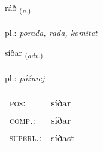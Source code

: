 \documentclass[frontgrid, backgrid]{flacards}\usepackage[]{graphicx}\usepackage[]{xcolor}
\begin{document}
\renewcommand{\flhead}{\vskip5pt \fboxsep=0pt {\small\bfseries\footnotesize Nafnorð | rzeczownik}}
\renewcommand{\fcfoot}{\vskip5pt \fboxsep=0pt \hspace{2pt}{\small\bfseries\footnotesize 1K}}

\renewcommand{\blhead}{\vskip5pt {\small\bfseries\footnotesize Nafnorð | rzeczownik }}
\renewcommand{\bcfoot}{\vskip5pt \hspace{2pt}{\small\bfseries\footnotesize 1K}}


{ráð \small{\textsubscript{(\textit{n.})}} \\[1ex] %
\textphonetic{[rauːð]} \\
pl.: \emph{porada, rada, komitet} \\  [2ex]
\renewcommand*{\arraystretch}{0.8}
}

\renewcommand{\flhead}{\vskip5pt \fboxsep=0pt {\small\bfseries\footnotesize Atviksorð | przysłówek}}
\renewcommand{\fcfoot}{\vskip5pt \fboxsep=0pt \hspace{2pt}{\small\bfseries\footnotesize 1K}}

\renewcommand{\blhead}{\vskip5pt {\small\bfseries\footnotesize Atviksorð | przysłówek }}
\renewcommand{\bcfoot}{\vskip5pt \hspace{2pt}{\small\bfseries\footnotesize 1K}}


{síðar \small{\textsubscript{(\textit{adv.})}} \\[1ex] %
\textphonetic{[siːðar]} \\
pl.: \emph{później} \\  [2ex]
\renewcommand*{\arraystretch}{0.8}
\begin{tabular}{ll}
\textsc{pos}: & síðar \\ 
\textsc{comp.}: & síðar \\ 
\textsc{superl.}: & síðast \\
\end{tabular}
}
\end{document}
